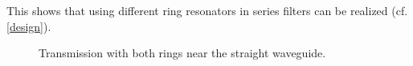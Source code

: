 This shows that using different ring resonators in series filters can be realized (cf. \ref{design}).


\begin{figure}%
\centering
\caption{Transmission with both rings near the straight waveguide.}%
\label{fig:07}%
\end{figure}

